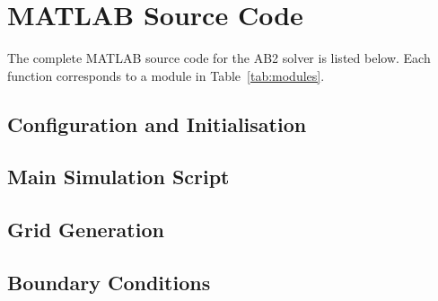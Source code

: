 \documentclass[12pt,a4paper]{article}
\begin{document}
\newpage

\section{MATLAB Source Code}
\label{app:code}

The complete MATLAB source code for the AB2 solver is listed below. Each function
corresponds to a module in Table~\ref{tab:modules}.

\subsection{Configuration and Initialisation}



\subsection{Main Simulation Script}


\subsection{Grid Generation}


\subsection{Boundary Conditions}




\end{document}
